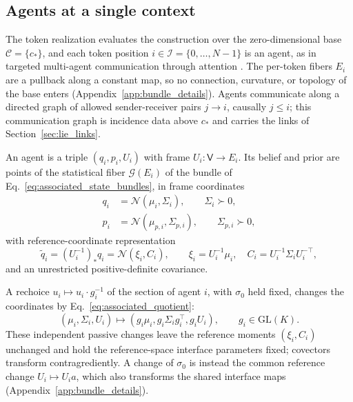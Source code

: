 \documentclass[twoside,11pt]{article}
\begin{document}
\subsection{Agents at a single context}
\label{sec:framed_states}

The token realization evaluates the construction over the zero-dimensional base \(\mathcal C=\{c_*\}\), and each token position \(i\in\mathcal I=\{0,\ldots,N-1\}\) is an agent, as in targeted multi-agent communication through attention \citep{Das2019TarMAC}. The per-token fibers \(E_i\) are a pullback along a constant map, so no connection, curvature, or topology of the base enters (Appendix~\ref{app:bundle_details}). Agents communicate along a directed graph of allowed sender-receiver pairs \(j\to i\), causally \(j\le i\); this communication graph is incidence data above \(c_*\) and carries the links of Section~\ref{sec:lie_links}.

An agent is a triple \((q_i,p_i,U_i)\) with frame \(U_i:\mathsf V\to E_i\). Its belief and prior are points of the statistical fiber \(\mathcal G(E_i)\) of the bundle of Eq.~\eqref{eq:associated_state_bundles}, in frame coordinates
\begin{align}
q_i&=\mathcal N(\mu_i,\Sigma_i),\qquad \Sigma_i\succ0,\label{eq:gaussian_states}\\
p_i&=\mathcal N(\mu_{p,i},\Sigma_{p,i}),\qquad \Sigma_{p,i}\succ0,\label{eq:base_priors}
\end{align}
with reference-coordinate representation
\begin{equation}
\widetilde q_i=(U_i^{-1})_*q_i
=\mathcal N(\xi_i,C_i),\qquad
\xi_i=U_i^{-1}\mu_i,\quad
C_i=U_i^{-1}\Sigma_iU_i^{-\top},
\label{eq:overview_reference_state}
\end{equation}
and an unrestricted positive-definite covariance.

A rechoice \(u_i\mapsto u_i\cdot g_i^{-1}\) of the section of agent \(i\), with \(\sigma_0\) held fixed, changes the coordinates by Eq.~\eqref{eq:associated_quotient}:
\begin{equation}
(\mu_i,\Sigma_i,U_i)\mapsto
(g_i\mu_i,g_i\Sigma_i g_i^\top,g_iU_i),
\qquad g_i\in\mathrm{GL}(K).
\label{eq:passive_site_action}
\end{equation}
These independent passive changes leave the reference moments \((\xi_i,C_i)\) unchanged and hold the reference-space interface parameters fixed; covectors transform contragrediently. A change of \(\sigma_0\) is instead the common reference change \(U_i\mapsto U_ia\), which also transforms the shared interface maps (Appendix~\ref{app:bundle_details}).
\end{document}
